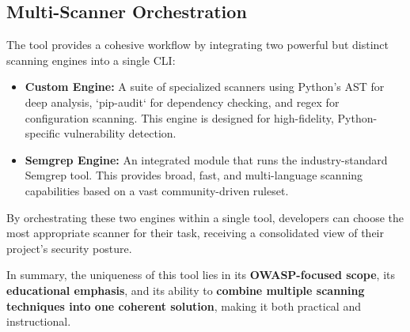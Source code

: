 \subsection{Multi-Scanner Orchestration}
The tool provides a cohesive workflow by integrating two powerful but distinct scanning engines into a single CLI:
\begin{itemize}
    \item \textbf{Custom Engine:} A suite of specialized scanners using Python's AST for deep analysis, `pip-audit` for dependency checking, and regex for configuration scanning. This engine is designed for high-fidelity, Python-specific vulnerability detection.
    \item \textbf{Semgrep Engine:} An integrated module that runs the industry-standard Semgrep tool. This provides broad, fast, and multi-language scanning capabilities based on a vast community-driven ruleset.
\end{itemize}

By orchestrating these two engines within a single tool, developers can choose the most appropriate scanner for their task, receiving a consolidated view of their project's security posture.


\vspace{1em}
\noindent In summary, the uniqueness of this tool lies in its \textbf{OWASP-focused scope}, its \textbf{educational emphasis}, and its ability to \textbf{combine multiple scanning techniques into one coherent solution}, making it both practical and instructional.